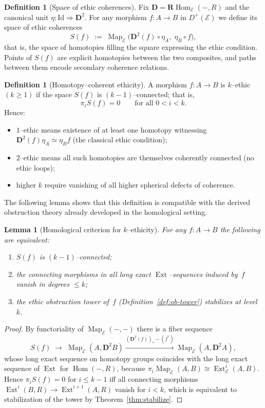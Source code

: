 \documentclass[12pt]{article}
\DeclareMathOperator{\Map}{Map}
\newcommand{\E}{\mathcal{E}}
\newcommand{\Hom}{\operatorname{Hom}}
\newcommand{\Ext}{\operatorname{Ext}}
\newcommand{\RHom}{\mathbf{R}\!\operatorname{Hom}}
\theoremstyle{plain}
\newtheorem{lemma}[theorem]{Lemma}
\theoremstyle{definition}
\newtheorem{definition}[theorem]{Definition}
\theoremstyle{remark}
\numberwithin{equation}{section}
\begin{document}
\begin{definition}[Space of ethic coherences]
Fix $\mathbf D=\RHom_\E(-,R)$ and the canonical unit $\eta:\mathrm{Id}\Rightarrow \mathbf D^2$.  
For any morphism $f:A\to B$ in $D^+(\E)$ we define its space of ethic coherences
\[
S(f)\;:=\;\Map_\E\bigl(\mathbf D^2(f)\!\circ\!\eta_A,\;\eta_B\!\circ\! f\bigr),
\]
that is, the space of homotopies filling the square expressing the ethic condition.  
Points of $S(f)$ are explicit homotopies between the two composites, and paths between them encode secondary coherence relations.
\end{definition}

\begin{definition}[Homotopy–coherent ethicity]
A morphism $f:A\to B$ is $k$–ethic $(k\ge 1)$ if the space $S(f)$ is $(k{-}1)$–connected; that is,
\[
\pi_i S(f)=0\qquad\text{for all }0<i<k.
\]
Hence:
\begin{itemize}
\item $1$--ethic means existence of at least one homotopy witnessing $\mathbf D^2(f)\eta_A\simeq \eta_Bf$ (the classical ethic condition);
\item $2$--ethic means all such homotopies are themselves coherently connected (no ethic loops);
\item higher $k$ require vanishing of all higher spherical defects of coherence.
\end{itemize}
\end{definition}

The following lemma shows that this definition is compatible with the derived obstruction theory already developed in the homological setting.

\begin{lemma}[Homological criterion for $k$–ethicity]
For any $f:A\to B$ the following are equivalent:
\begin{enumerate}[label=(\roman*)]
\item $S(f)$ is $(k{-}1)$–connected;
\item the connecting morphisms in all long exact $\Ext$–sequences induced by~$f$ vanish in degrees $\le k$;
\item the ethic obstruction tower of~$f$ (Definition~\ref{def:ob-tower}) stabilizes at level~$k$.
\end{enumerate}
\end{lemma}

\begin{proof}
By functoriality of $\Map_\E(-,-)$ there is a fiber sequence
\[
S(f)\;\longrightarrow\;
\Map_\E(A,\mathbf D^2B)
\xrightarrow{(\mathbf D^2(f))_\ast-(f^\ast)}
\Map_\E(A,\mathbf D^2A),
\]
whose long exact sequence on homotopy groups coincides with the long exact sequence of $\Ext$ for $\Hom(-,R)$, because $\pi_i\Map_\E(A,B)\cong\Ext^i_\E(A,B)$.  
Hence $\pi_iS(f)=0$ for $i\le k{-}1$ iff all connecting morphisms $\Ext^i(B,R)\to\Ext^{i+1}(A,R)$ vanish for $i<k$, which is equivalent to stabilization of the tower by Theorem~\ref{thm:stabilize}.
\end{proof}
\end{document}
